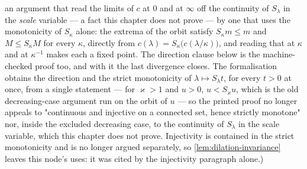 \begin{proposition}
{an argument that read the limits of $c$ at $0$ and at $\infty$ off the continuity of $S_\lambda$
in the \emph{scale} variable --- a fact this chapter does not prove --- by one that uses the
monotonicity of $S_\kappa$ alone: the extrema of the orbit satisfy $S_\kappa m \le m$ and
$M \le S_\kappa M$ for every $\kappa$, directly from
$c(\lambda) = S_\kappa\bigl(c(\lambda/\kappa)\bigr)$, and reading that at $\kappa$ and at
$\kappa^{-1}$ makes each a fixed point. The direction clause below is the machine-checked proof
too, and with it the last divergence closes. The formalisation obtains the direction and the
strict monotonicity of $\lambda \mapsto S_\lambda t$, for every $t > 0$ at once, from a single
statement --- for $\varkappa > 1$ and $u > 0$, $u < S_\varkappa u$, which is the old
decreasing-case argument run on the orbit of $u$ --- so the printed proof no longer appeals to
"continuous and injective on a connected set, hence strictly monotone" nor, inside the excluded
decreasing case, to the continuity of $S_\lambda$ in the scale variable, which this chapter does
not prove. Injectivity is contained in the strict monotonicity and is no longer argued
separately, so \ref{lem:dilation-invariance} leaves this node's uses: it was cited by the
injectivity paragraph alone.)}
\end{proposition}

